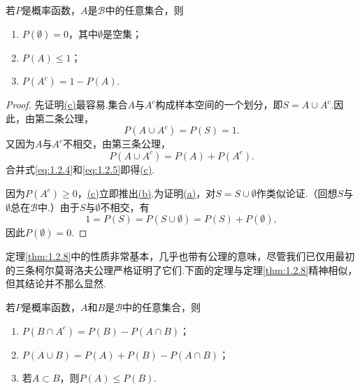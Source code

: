 \begin{theorem}\label{thm:1.2.8}
若$P$是概率函数，$A$是$\mathscr B$中的任意集合，则
\begin{enumerate}
\item[(a)]\label{itm:thm:1.2.8:a} $P(\emptyset)=0$，其中$\emptyset$是空集；
\item[(b)]\label{itm:thm:1.2.8:b} $P(A)\le1$；
\item[(c)]\label{itm:thm:1.2.8:c} $P(A^c)=1-P(A)$.
\end{enumerate}
\end{theorem}
\begin{proof}
先证明\hyperref[itm:thm:1.2.8:c]{(c)}最容易.集合$A$与$A^c$构成样本空间的一个划分，即$S=A\cup A^c$.因此，由第二条公理，
\begin{equation}\label{eq:1.2.4}P(A\cup A^c)=P(S)=1.\end{equation}
又因为$A$与$A^c$不相交，由第三条公理，
\begin{equation}\label{eq:1.2.5}P(A\cup A^c)=P(A)+P(A^c).\end{equation}
合并式\eqref{eq:1.2.4}和\eqref{eq:1.2.5}即得\hyperref[itm:thm:1.2.8:c]{(c)}.

因为$P(A^c)\ge0$，\hyperref[itm:thm:1.2.8:c]{(c)}立即推出\hyperref[itm:thm:1.2.8:b]{(b)}.为证明\hyperref[itm:thm:1.2.8:a]{(a)}，对$S=S\cup\emptyset$作类似论证.（回想$S$与$\emptyset$总在$\mathscr B$中.）由于$S$与$\emptyset$不相交，有
$$1=P(S)=P(S\cup\emptyset)=P(S)+P(\emptyset),$$
因此$P(\emptyset)=0$.
\end{proof}
定理\ref{thm:1.2.8}中的性质非常基本，几乎也带有公理的意味，尽管我们已仅用最初的三条柯尔莫哥洛夫公理严格证明了它们.下面的定理与定理\ref{thm:1.2.8}精神相似，但其结论并不那么显然.
\begin{theorem}\label{thm:1.2.9}
若$P$是概率函数，$A$和$B$是$\mathscr B$中的任意集合，则
\begin{enumerate}
\item[(a)]\label{itm:thm:1.2.9:a} $P(B\cap A^c)=P(B)-P(A\cap B)$；
\item[(b)]\label{itm:thm:1.2.9:b} $P(A\cup B)=P(A)+P(B)-P(A\cap B)$；
\item[(c)]\label{itm:thm:1.2.9:c} 若$A\subset B$，则$P(A)\le P(B)$.
\end{enumerate}
\end{theorem}
